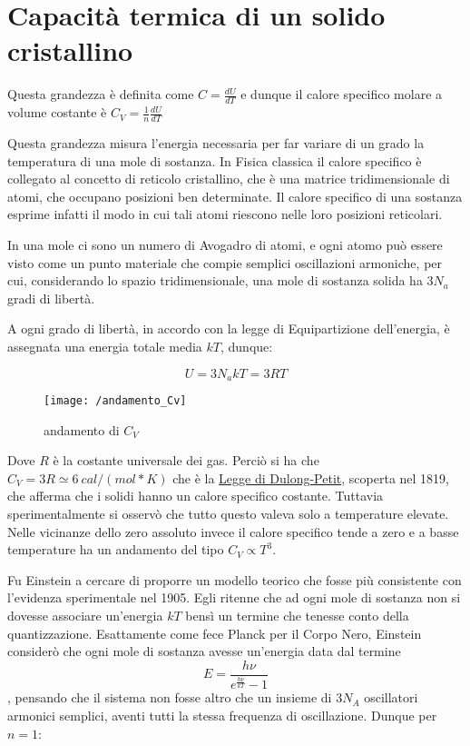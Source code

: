 
\section{Capacità termica di un solido cristallino}

Questa grandezza è definita come $C = \frac{ dU}{dT }$ e dunque il calore specifico molare a volume costante è $C_V = \frac{ 1}{n } \frac{ dU}{dT }$

Questa grandezza misura l'energia necessaria per far variare di un grado la temperatura di una mole di sostanza.
In Fisica classica il calore specifico è collegato al concetto di reticolo cristallino, che è una matrice tridimensionale di atomi, che occupano posizioni ben determinate.
Il calore specifico di una sostanza esprime infatti il modo in cui tali atomi riescono nelle loro posizioni reticolari.

In una mole ci sono un numero di Avogadro di atomi, e ogni atomo può essere visto come un punto materiale che compie semplici oscillazioni armoniche, per cui,
considerando lo spazio tridimensionale, una mole di sostanza solida ha $3 N_a$ gradi di libertà.

A ogni grado di libertà, in accordo con la legge di Equipartizione dell'energia, è assegnata una energia totale media $kT$, dunque:

\begin{equation}
U = 3 N_a k T = 3 R T
\end{equation}
\begin{figure}[h]
\centering
\texttt{[image: /andamento\_Cv]}
\caption{andamento di $C_V$}
\end{figure}
Dove $R$ è la costante universale dei gas. 
Perciò si ha che $C_V = 3 R \simeq \SI{6}{cal / (mol * K)}$ che è la \underline{Legge di Dulong-Petit}, scoperta nel 1819, che afferma che i solidi hanno un calore specifico costante. 
Tuttavia sperimentalmente si osservò che tutto questo valeva solo a temperature elevate.
Nelle vicinanze dello zero assoluto invece il calore specifico tende a zero e a basse temperature ha un andamento del tipo $C_V \propto T^3$.

Fu Einstein a cercare di proporre un modello teorico che fosse più consistente con l'evidenza sperimentale nel 1905.
Egli ritenne che ad ogni mole di sostanza non si dovesse associare un'energia $kT$ bensì un termine che tenesse conto della quantizzazione.
Esattamente come fece Planck per il Corpo Nero, Einstein considerò che ogni mole di sostanza avesse un'energia data dal termine
$$E = \frac{ h \nu}{e^{ \frac{ h\nu}{k T } } - 1 }$$, 
pensando che il sistema non fosse altro che un insieme di $3 N_A$ oscillatori armonici semplici, aventi tutti la stessa frequenza di oscillazione.
Dunque per $n=1$:


